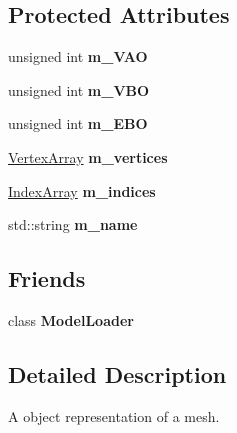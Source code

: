 \subsection*{Protected Attributes}
\begin{DoxyCompactItemize}
\item 
\mbox{\label{classce_1_1graphics_1_1_mesh_a8a9d810a84babc359088216a34149004}} 
unsigned int {\bfseries m\+\_\+\+V\+AO}
\item 
\mbox{\label{classce_1_1graphics_1_1_mesh_a4b1ba8be0e3005bbe35ab9b65525f16d}} 
unsigned int {\bfseries m\+\_\+\+V\+BO}
\item 
\mbox{\label{classce_1_1graphics_1_1_mesh_a40681c51b3147e18129b82b768ff935e}} 
unsigned int {\bfseries m\+\_\+\+E\+BO}
\item 
\mbox{\label{classce_1_1graphics_1_1_mesh_a7ef8ad299b4f4c9d9488f6c547d4fd7e}} 
\hyperlink{_vertex_8h_a72d0effc290681342d1fc2b5fffa6aef}{Vertex\+Array} {\bfseries m\+\_\+vertices}
\item 
\mbox{\label{classce_1_1graphics_1_1_mesh_a94287f8ee272274fe7ee4a6716f2c509}} 
\hyperlink{_vertex_8h_a25b1e42db1e356e8bfc3ab61ade25040}{Index\+Array} {\bfseries m\+\_\+indices}
\item 
\mbox{\label{classce_1_1graphics_1_1_mesh_aa6598a29dc63d2e99adc85b78168c675}} 
std\+::string {\bfseries m\+\_\+name}
\end{DoxyCompactItemize}
\subsection*{Friends}
\begin{DoxyCompactItemize}
\item 
\mbox{\label{classce_1_1graphics_1_1_mesh_ac22dade55c1e8f81ea3e0892cd321190}} 
class {\bfseries Model\+Loader}
\end{DoxyCompactItemize}


\subsection{Detailed Description}
A object representation of a mesh. 

